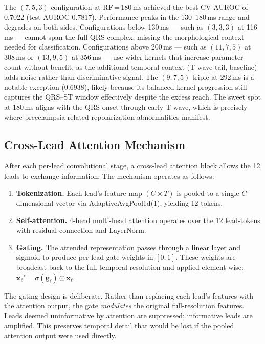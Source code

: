 \documentclass[sigconf,nonacm]{acmart}
\begin{document}
The $(7,5,3)$ configuration at RF\,=\,180\,ms achieved the best CV AUROC of 0.7022 (test AUROC 0.7817). Performance peaks in the 130--180\,ms range and degrades on both sides. Configurations below 130\,ms --- such as $(3,3,3)$ at 116\,ms --- cannot span the full QRS complex, missing the morphological context needed for classification. Configurations above 200\,ms --- such as $(11,7,5)$ at 308\,ms or $(13,9,5)$ at 356\,ms --- use wider kernels that increase parameter count without benefit, as the additional temporal context (T-wave tail, baseline) adds noise rather than discriminative signal. The $(9,7,5)$ triple at 292\,ms is a notable exception (0.6938), likely because its balanced kernel progression still captures the QRS--ST window effectively despite the excess reach. The sweet spot at 180\,ms aligns with the QRS onset through early T-wave, which is precisely where preeclampsia-related repolarization abnormalities manifest.

\subsection{Cross-Lead Attention Mechanism}

After each per-lead convolutional stage, a cross-lead attention block allows the 12 leads to exchange information. The mechanism operates as follows:
\begin{enumerate}
\item \textbf{Tokenization.} Each lead's feature map $(C \times T)$ is pooled to a single $C$-dimensional vector via AdaptiveAvgPool1d(1), yielding 12 tokens.
\item \textbf{Self-attention.} 4-head multi-head attention operates over the 12 lead-tokens with residual connection and LayerNorm.
\item \textbf{Gating.} The attended representation passes through a linear layer and sigmoid to produce per-lead gate weights in $[0, 1]$. These weights are broadcast back to the full temporal resolution and applied element-wise: $\mathbf{x}_\ell' = \sigma(\mathbf{g}_\ell) \odot \mathbf{x}_\ell$.
\end{enumerate}

The gating design is deliberate. Rather than replacing each lead's features with the attention output, the gate \textit{modulates} the original full-resolution features. Leads deemed uninformative by attention are suppressed; informative leads are amplified. This preserves temporal detail that would be lost if the pooled attention output were used directly.
\end{document}
